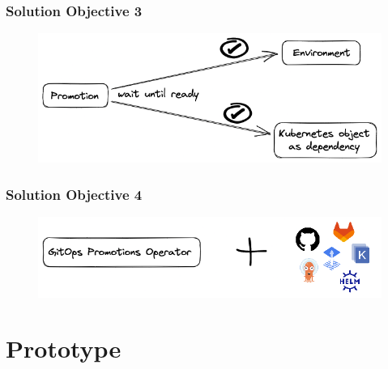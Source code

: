 \documentclass{beamer}
\begin{document}
\begin{frame}
	\frametitle{Solution Objective 3}
	\begin{figure}[h]
		\centering
		\includegraphics[width=1.0\linewidth]{assets/OBJ3R1.png}
		\label{fig:OBJ3R1}	
	\end{figure}
\end{frame}
\begin{frame}
	\frametitle{Solution Objective 4}
	\begin{figure}[h]
		\centering
		\includegraphics[width=1.0\linewidth]{assets/OBJ4R1.png}
		\label{fig:OBJ4R1}	
	\end{figure}
\end{frame}



\section{Prototype}
\end{document}
